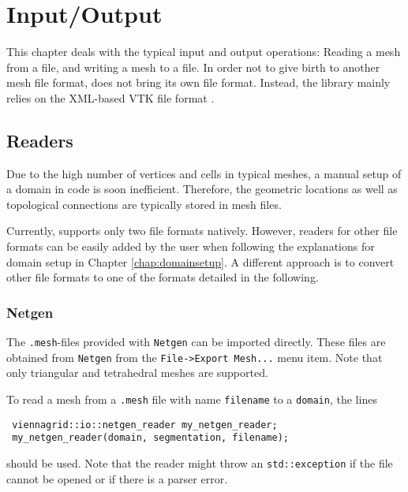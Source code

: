 \chapter{Input/Output} \label{chap:io}

 

This chapter deals with the typical input and output operations: Reading a mesh from a file, and writing a mesh to a file.
In order not to give birth to another mesh file format, {\ViennaGrid} does not bring its own file format. 
Instead, the library mainly relies on the XML-based VTK \cite{VTK} file format \cite{VTKfileformat}.




\section{Readers}
Due to the high number of vertices and cells in typical meshes,
a manual setup of a domain in code is soon inefficient. Therefore,
the geometric locations as well as topological connections are typically stored in mesh files.

Currently, {\ViennaGrid} supports only two file formats natively. However, readers for other file formats
can be easily added by the user when following the explanations for domain setup in Chapter \ref{chap:domainsetup}.
A different approach is to convert other file formats to one of the formats detailed in the following.


 \subsection{Netgen}
 The \texttt{.mesh}-files provided with \texttt{Netgen} \cite{netgen} can be imported directly.
 These files are obtained from \texttt{Netgen} from the \texttt{File->Export Mesh...} menu item. Note that only triangular and tetrahedral meshes are supported.

 To read a mesh from a \texttt{.mesh} file with name \lstinline|filename| to a \lstinline|domain|, the lines
 \begin{lstlisting}
 viennagrid::io::netgen_reader my_netgen_reader;
 my_netgen_reader(domain, segmentation, filename);
 \end{lstlisting}
 should be used. Note that the reader might throw an \lstinline|std::exception| if the file cannot be opened or if there is a parser error.

